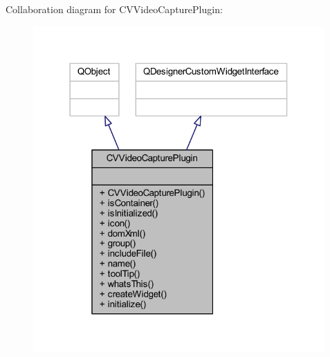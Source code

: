 Collaboration diagram for C\+V\+Video\+Capture\+Plugin\+:\nopagebreak
\begin{figure}[H]
\begin{center}
\leavevmode
\includegraphics[width=316pt]{d5/db9/class_c_v_video_capture_plugin__coll__graph}
\end{center}
\end{figure}
